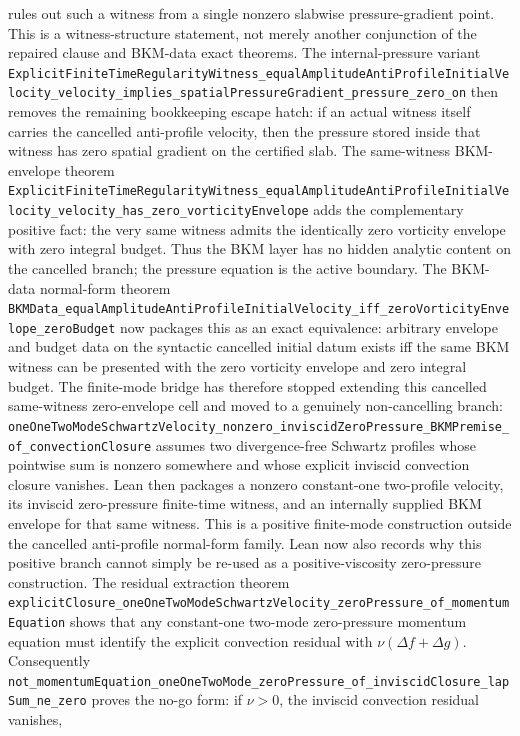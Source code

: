 \documentclass[11pt]{article}
\begin{document}
rules out such a witness from a single nonzero slabwise pressure-gradient
point.  This is a witness-structure statement, not merely another conjunction
of the repaired clause and BKM-data exact theorems.  The internal-pressure
variant
\texttt{ExplicitFiniteTimeRegularityWitness\_equalAmplitudeAntiProfileInitialVelocity\_velocity\_implies\_spatialPressureGradient\_pressure\_zero\_on}
then removes the remaining bookkeeping escape hatch: if an actual witness
itself carries the cancelled anti-profile velocity, then the pressure stored
inside that witness has zero spatial gradient on the certified slab.  The
same-witness BKM-envelope theorem
\texttt{ExplicitFiniteTimeRegularityWitness\_equalAmplitudeAntiProfileInitialVelocity\_velocity\_has\_zero\_vorticityEnvelope}
adds the complementary positive fact: the very same witness admits the
identically zero vorticity envelope with zero integral budget.  Thus the BKM
layer has no hidden analytic content on the cancelled branch; the pressure
equation is the active boundary.  The BKM-data normal-form theorem
\texttt{BKMData\_equalAmplitudeAntiProfileInitialVelocity\_iff\_zeroVorticityEnvelope\_zeroBudget}
now packages this as an exact equivalence: arbitrary envelope and budget data
on the syntactic cancelled initial datum exists iff the same BKM witness can be
presented with the zero vorticity envelope and zero integral budget.  The
finite-mode bridge has therefore stopped extending this cancelled
same-witness zero-envelope cell and moved to a genuinely non-cancelling
branch:
\texttt{oneOneTwoModeSchwartzVelocity\_nonzero\_inviscidZeroPressure\_BKMPremise\_of\_convectionClosure}
assumes two divergence-free Schwartz profiles whose pointwise sum is nonzero
somewhere and whose explicit inviscid convection closure vanishes.  Lean then
packages a nonzero constant-one two-profile velocity, its inviscid
zero-pressure finite-time witness, and an internally supplied BKM envelope for
that same witness.  This is a positive finite-mode construction outside the
cancelled anti-profile normal-form family.
Lean now also records why this positive branch cannot simply be re-used as a
positive-viscosity zero-pressure construction.  The residual extraction theorem
\texttt{explicitClosure\_oneOneTwoModeSchwartzVelocity\_zeroPressure\_of\_momentumEquation}
shows that any constant-one two-mode zero-pressure momentum equation must
identify the explicit convection residual with
\(\nu(\Delta f+\Delta g)\).  Consequently
\texttt{not\_momentumEquation\_oneOneTwoMode\_zeroPressure\_of\_inviscidClosure\_lapSum\_ne\_zero}
proves the no-go form: if \(\nu>0\), the inviscid convection residual vanishes,
\end{document}
